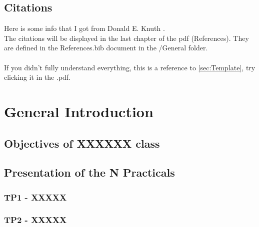 \documentclass[a4paper, table]{article}
\begin{document}
\subsection{Citations}
Here is some info that I got from Donald E. Knuth \cite{texbook}. \\
The citations will be displayed in the last chapter of the pdf (References). They are defined in the References.bib document in the /General folder. \\
\\
If you didn't fully understand everything, this is a reference to \cref{sec:Template}, try clicking it in the .pdf. 
\newpage














\section{General Introduction}
\label{sec:Intro}

\subsection{Objectives of XXXXXX class}

\lipsum[1]

\subsection{Presentation of the N Practicals}
    \subsubsection{TP1 - XXXXX}
    
    \lipsum[1]

    \subsubsection{TP2 - XXXXX}
    
    \lipsum[1]
\end{document}
